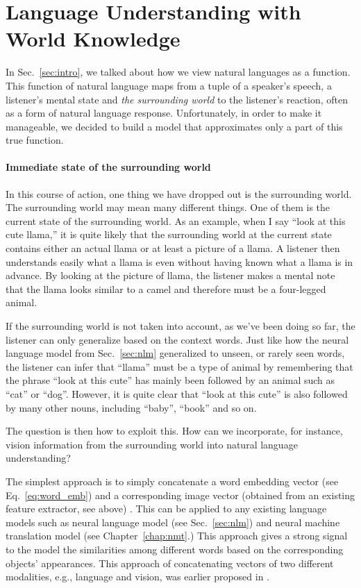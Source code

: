 \documentclass{report}
\begin{document}
\section{Language Understanding with World Knowledge}

In Sec.~\ref{sec:intro}, we talked about how we view natural languages as a
function. This function of natural language maps from a tuple of a speaker's
speech, a listener's mental state and {\em the surrounding world} to the
listener's reaction, often as a form of natural language response.
Unfortunately, in order to make it manageable, we decided to build a model that
approximates only a part of this true function. 

\paragraph{Immediate state of the surrounding world} 

In this course of action, one thing we have dropped out is the surrounding
world. The surrounding world may mean many different things. One of them is
the current state of the surrounding world. As an example, when I say ``look at
this cute llama,'' it is quite likely that the surrounding world at the current
state contains either an actual llama or at least a picture of a llama. A
listener then understands easily what a llama is even without having known what
a llama is in advance. By looking at the picture of llama, the listener makes a
mental note that the llama looks similar to a camel and therefore must be a
four-legged animal.

If the surrounding world is not taken into account, as we've been doing so far,
the listener can only generalize based on the context words. Just like how the
neural language model from Sec.~\ref{sec:nlm} generalized to unseen, or rarely
seen words, the listener can infer that ``llama'' must be a type of animal by
remembering that the phrase ``look at this cute'' has mainly been followed by an
animal such as ``cat'' or ``dog''. However, it is quite clear that ``look at
this cute'' is also followed by many other nouns, including ``baby'', ``book''
and so on.

The question is then how to exploit this. How can we incorporate, for instance,
vision information from the surrounding world into natural language
understanding? 

The simplest approach is to simply concatenate a word embedding vector (see
Eq.~\eqref{eq:word_emb}) and a corresponding image vector (obtained from an
existing feature extractor, see above) \citep{kiela2014learning}. This can be
applied to any existing language models such as neural language model (see
Sec.~\ref{sec:nlm}) and neural machine translation model (see
Chapter~\ref{chap:nmt}.) This approach gives a strong signal to the model the
similarities among different words based on the corresponding objects'
appearances. This approach of concatenating vectors of two different modalities,
e.g., language and vision, was earlier proposed in \citet{weston2010large}. 
\end{document}
